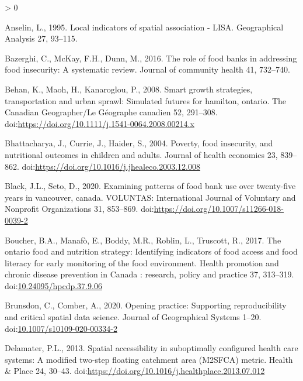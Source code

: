 \documentclass[]{elsarticle} %
\newlength{\cslhangindent}
\newenvironment{CSLReferences}[2] %
 {%
  \setlength{\parindent}{0pt}
  \ifodd #1 \everypar{\setlength{\hangindent}{\cslhangindent}}\ignorespaces\fi
  \ifnum #2 > 0
  \setlength{\parskip}{#2\baselineskip}
  \fi
 }%
 {}
\begin{document}
\hypertarget{refs}{}
\begin{CSLReferences}{1}{0}
\leavevmode\hypertarget{ref-anselin1995local}{}%
Anselin, L., 1995. Local indicators of spatial association - LISA.
Geographical Analysis 27, 93--115.

\leavevmode\hypertarget{ref-bazerghi2016role}{}%
Bazerghi, C., McKay, F.H., Dunn, M., 2016. The role of food banks in
addressing food insecurity: A systematic review. Journal of community
health 41, 732--740.

\leavevmode\hypertarget{ref-behan2008smart}{}%
Behan, K., Maoh, H., Kanaroglou, P., 2008. Smart growth strategies,
transportation and urban sprawl: Simulated futures for hamilton,
ontario. The Canadian Geographer/Le G{é}ographe canadien 52, 291--308.
doi:\url{https://doi.org/10.1111/j.1541-0064.2008.00214.x}

\leavevmode\hypertarget{ref-bhattacharya2004poverty}{}%
Bhattacharya, J., Currie, J., Haider, S., 2004. Poverty, food
insecurity, and nutritional outcomes in children and adults. Journal of
health economics 23, 839--862.
doi:\url{https://doi.org/10.1016/j.jhealeco.2003.12.008}

\leavevmode\hypertarget{ref-black2020examining}{}%
Black, J.L., Seto, D., 2020. Examining patterns of food bank use over
twenty-five years in vancouver, canada. VOLUNTAS: International Journal
of Voluntary and Nonprofit Organizations 31, 853--869.
doi:\url{https://doi.org/10.1007/s11266-018-0039-2}

\leavevmode\hypertarget{ref-boucher2017ontario}{}%
Boucher, B.A., Manafò, E., Boddy, M.R., Roblin, L., Truscott, R., 2017.
The ontario food and nutrition strategy: Identifying indicators of food
access and food literacy for early monitoring of the food environment.
Health promotion and chronic disease prevention in Canada : research,
policy and practice 37, 313--319.
doi:\href{https://doi.org/10.24095/hpcdp.37.9.06}{10.24095/hpcdp.37.9.06}

\leavevmode\hypertarget{ref-brunsdon2020opening}{}%
Brunsdon, C., Comber, A., 2020. Opening practice: Supporting
reproducibility and critical spatial data science. Journal of
Geographical Systems 1--20.
doi:\href{https://doi.org/10.1007/s10109-020-00334-2}{10.1007/s10109-020-00334-2}

\leavevmode\hypertarget{ref-delamater2013spatial}{}%
Delamater, P.L., 2013. Spatial accessibility in suboptimally configured
health care systems: A modified two-step floating catchment area
(M2SFCA) metric. Health \& Place 24, 30--43.
doi:\url{https://doi.org/10.1016/j.healthplace.2013.07.012}


\end{CSLReferences}
\end{document}
